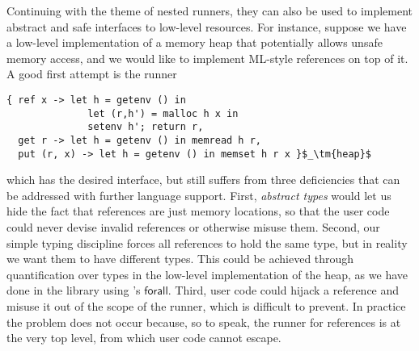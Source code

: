 \begin{example}
  \label{ex:ml-ref}
  Continuing with the theme of nested runners, they can also be used to implement abstract
  and safe interfaces to low-level resources. For instance, suppose we have a low-level
  implementation of a memory heap that potentially allows unsafe memory access, and we would
  like to implement ML-style references on top of it. A good first attempt is the runner
%
\begin{lstlisting}
{ ref x -> let h = getenv () in
              let (r,h') = malloc h x in
              setenv h'; return r,
  get r -> let h = getenv () in memread h r,
  put (r, x) -> let h = getenv () in memset h r x }$_\tm{heap}$
\end{lstlisting}
%
  which has the desired interface, but still suffers from three deficiencies that can be
  addressed with further language support. First, \emph{abstract types} would let us hide the
  fact that references are just memory locations, so that the user code could never devise
  invalid references or otherwise misuse them. Second, our simple typing discipline forces
  all references to hold the same type, but in reality we want them to have different types.
  This could be achieved through quantification over types in the low-level implementation of 
  the heap, as we have done in the  library using 's $\mathsf{forall}$.
  Third, user code could hijack a reference and
  misuse it out of the scope of the runner, which is difficult to prevent. In practice the
  problem does not occur because, so to speak, the runner for references is at the very top level,
  from which user code cannot escape.
\end{example}

